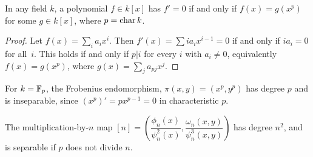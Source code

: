 \begin{lem}\label{derivequals0lma}
In any field $k$, a polynomial $f\in k[x]$ has $f'=0$ if and only if $f(x)=g(x^p)$ for some $g\in k[x]$, where $p=\operatorname{char} k$.
\end{lem}

\begin{proof}
Let $f(x)=\sum_i a_i x^i$. Then $f'(x)=\sum ia_ix^{i-1}=0$ if and only if $ia_i=0$ for all~$i$. This holds if and only if $p|i$ for every $i$ with $a_i\ne0$, equivalently $f(x)=g(x^p)$, where $g(x)=\sum_j a_{pj}x^j$.
\end{proof}

\begin{ex}
For $k=\mathbb{F}_p$, the Frobenius endomorphism, $\pi(x,y)=(x^p,y^p)$ has degree $p$ and is inseparable, since $(x^p)'=px^{p-1}=0$ in characteristic $p$. 
\end{ex}

\begin{thm}\label{nmapdeg}
The multiplication-by-$n$ map $[n]=\left(\dfrac{\phi_n(x)}{\psi_n^2(x)},\dfrac{\omega_n(x,y)}{\psi_n^3(x,y)}\right)$ has degree $n^2$, and is separable if $p$ does not divide $n$.
\end{thm}

